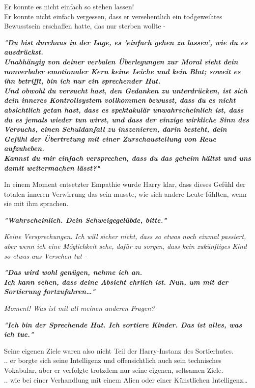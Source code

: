 {Er konnte es nicht einfach so stehen lassen!\\ Er konnte nicht einfach vergessen, dass er versehentlich ein todgeweihtes Bewusstsein erschaffen hatte, das nur sterben wollte -

\textbf{\emph{"Du bist durchaus in der Lage, es 'einfach gehen zu lassen', wie du es ausdrückst.\\ Unabhängig von deiner verbalen Überlegungen zur Moral sieht dein nonverbaler emotionaler Kern keine Leiche und kein Blut; soweit es ihn betrifft, bin ich nur ein sprechender Hut.\\ Und obwohl du versucht hast, den Gedanken zu unterdrücken, ist sich dein inneres Kontrollsystem vollkommen bewusst, dass du es nicht absichtlich getan hast, dass es spektakulär unwahrscheinlich ist, dass du es jemals wieder tun wirst, und dass der einzige wirkliche Sinn des Versuchs, einen Schuldanfall zu inszenieren, darin besteht, dein Gefühl der Übertretung mit einer Zurschaustellung von Reue aufzuheben.\\ Kannst du mir einfach versprechen, dass du das geheim hältst und uns damit weitermachen lässt?"}}

In einem Moment entsetzter Empathie wurde Harry klar, dass dieses Gefühl der totalen inneren Verwirrung das sein musste, wie sich andere Leute fühlten, wenn sie mit ihm sprachen.

\textbf{\emph{"Wahrscheinlich. Dein Schweigegelübde, bitte."}}

\emph{Keine Versprechungen. Ich will sicher nicht, dass so etwas noch einmal passiert, aber wenn ich eine Möglichkeit sehe, dafür zu sorgen, dass kein zukünftiges Kind so etwas aus Versehen tut -}

\textbf{\emph{"Das wird wohl genügen, nehme ich an.\\ Ich kann sehen, dass deine Absicht ehrlich ist. Nun, um mit der Sortierung fortzufahren…"}}

\emph{Moment! Was ist mit all meinen anderen Fragen?}

\textbf{\emph{"Ich bin der Sprechende Hut. Ich sortiere Kinder. Das ist alles, was ich tue."}}

Seine eigenen Ziele waren also nicht Teil der Harry-Instanz des Sortierhutes.\\ .. er borgte sich seine Intelligenz und offensichtlich auch sein technisches Vokabular, aber er verfolgte trotzdem nur seine eigenen, seltsamen Ziele.\\ .. wie bei einer Verhandlung mit einem Alien oder einer Künstlichen Intelligenz…

}
